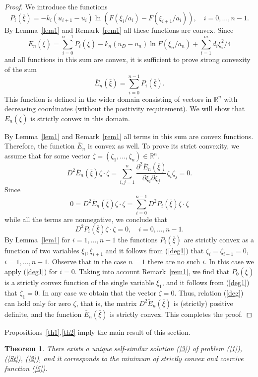 \documentclass[10pt,a4paper]{amsart}
\newtheorem{theorem}{Theorem}[section]
\numberwithin{equation}{section}
\newcommand{\R}{{\mathbb R}}
\begin{document}
\begin{proof}
We introduce the functions
\[P_i(\bar\xi)=-k_i(u_{i+1}-u_i)\ln (F(\xi_i/a_i)-F(\xi_{i+1}/a_i)), \quad i=0,\ldots,n-1.\]
By Lemma~\ref{lem1} and Remark~\ref{rem1} all these functions are convex.
Since
\[
E_n(\bar\xi)=\sum_{i=0}^{n-1} P_i(\bar\xi)-k_n(u_D-u_n)\ln F(\xi_n/a_n)+\sum_{i=1}^m d_i\xi_i^2/4
\]
and all functions in this sum are convex, it is sufficient to prove strong convexity of the sum
\[
\bar E_n(\bar\xi)=\sum_{i=0}^{n-1} P_i(\bar\xi).
\]
This function is defined in the wider domain consisting of vectors in $\R^n$ with decreasing coordinates (without the positivity requirement). We will show that $\bar E_n(\bar\xi)$ is strictly convex in this domain.

By Lemma~\ref{lem1} and Remark~\ref{rem1} all terms in this sum are convex functions. Therefore, the function $\bar E_n$ is convex as well. To prove its strict convexity, we assume that for some vector $\zeta=(\zeta_1,\ldots,\zeta_n)\in\R^n$.
\begin{equation}\label{deg}
D^2 \bar E_n(\bar\xi)\zeta\cdot\zeta=\sum_{i,j=1}^n \frac{\partial^2 \bar E_n(\bar\xi)}{\partial\xi_i\partial\xi_j}\zeta_i\zeta_j=0.
\end{equation}
Since
\[
0=D^2 \bar E_n(\bar\xi)\zeta\cdot\zeta=\sum_{i=0}^{n-1} D^2 P_i(\bar\xi)\zeta\cdot\zeta
\]
while all the terms are nonnegative, we conclude that
\begin{equation}\label{deg1}
D^2 P_i(\bar\xi)\zeta\cdot\zeta=0, \quad i=0,\ldots,n-1.
\end{equation}
By Lemma~\ref{lem1} for $i=1,\ldots,n-1$ the functions $P_i(\bar\xi)$ are strictly convex as a function of two variables $\xi_i,\xi_{i+1}$ and it follows from (\ref{deg1}) that $\zeta_i=\zeta_{i+1}=0$, $i=1,\ldots,n-1$. Observe that in the case $n=1$ there are no such $i$. In this case we apply (\ref{deg1}) for $i=0$. Taking into account Remark~\ref{rem1}, we find that $P_0(\bar\xi)$ is a strictly convex function of the single variable $\xi_1$, and it follows from (\ref{deg1}) that $\zeta_1=0$. In any case we obtain that the vector $\zeta=0$. Thus, relation (\ref{deg}) can hold only for zero $\zeta$, that is, the matrix $D^2\tilde E_n(\bar\xi)$ is (strictly) positive definite, and the function $\bar E_n(\bar\xi)$ is strictly convex. This completes the proof.
\end{proof}
Propositions~\ref{th1},\ref{th2} imply the main result of this section.

\begin{theorem}\label{th3}
There exists a unique self-similar solution (\ref{3}) of problem (\ref{1}), (\ref{St}), (\ref{2}), and it corresponds to the minimum of strictly convex and coercive function (\ref{5}).
\end{theorem}
\end{document}
